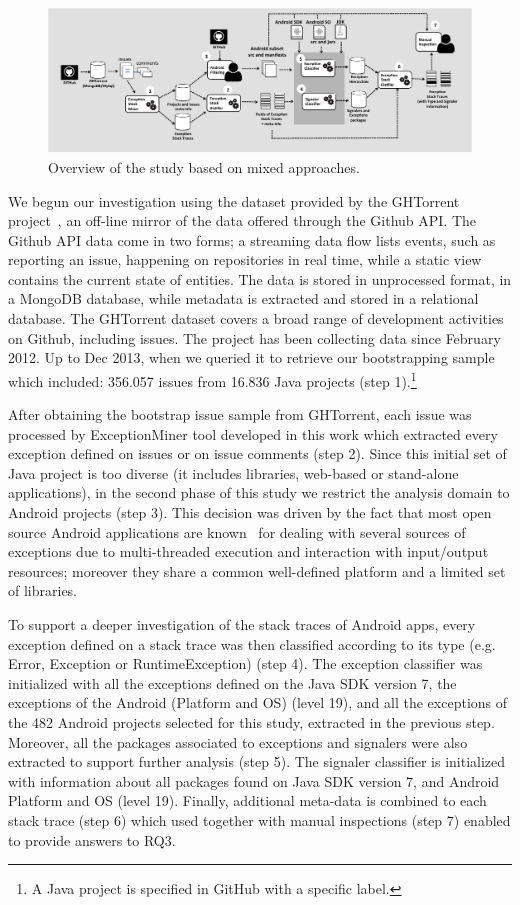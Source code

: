 \documentclass[conference]{IEEEtran}
\begin{document}
\begin{figure}
\centering
\includegraphics[width=\hsize]{overview.pdf}
\caption{Overview of the study based on mixed approaches.}
\label{fig:overviewfig}
\end{figure}

We begun our investigation using the dataset provided by the GHTorrent
project~\cite{Gousi13}, an off-line mirror of the data offered through the
Github API. The Github API data come in two forms; a streaming data flow lists
events, such as reporting an issue, happening on repositories in real time,
while a static view contains the current state of entities. The data is stored
in unprocessed format, in a MongoDB database, while metadata is extracted and
stored in a relational database. The GHTorrent dataset covers a broad range of
development activities on Github, including issues. The project has been
collecting data since February 2012. Up to Dec 2013, when we queried it to
retrieve our bootstrapping sample which included: 356.057 issues from 16.836
Java projects (step 1).\footnote{A Java project is specified in GitHub with a
specific label.}

After obtaining the bootstrap issue sample from GHTorrent, each issue was
processed by ExceptionMiner tool developed in this work which extracted every
exception defined on issues or on issue comments (step 2). Since this initial
set of Java project is too diverse (it includes libraries, web-based or
stand-alone applications), in the second phase of this study we restrict the
analysis domain to Android projects (step 3). This decision was driven by the
fact that most open source Android applications are known~\cite{ref} for dealing
with several sources of exceptions due to multi-threaded execution and
interaction with input/output resources; moreover they share a common
well-defined platform and a limited set of libraries.

To support a deeper investigation of the stack traces of Android apps, every
exception defined on a stack trace was then classified according to its type
(e.g. Error, Exception or RuntimeException) (step 4). The exception classifier
was initialized with all the exceptions defined on the Java SDK version 7, the
exceptions of the Android (Platform and OS) (level 19), and all the exceptions
of the 482 Android projects selected for this study, extracted in the previous
step. Moreover, all the packages associated to exceptions and signalers were
also extracted to support further analysis (step 5). The signaler classifier is
initialized with information about all packages found on Java SDK version 7, and
Android Platform and OS (level 19). Finally, additional meta-data is combined to
each stack trace (step 6) which used together with manual inspections (step 7)
enabled to provide answers to RQ3.
\end{document}
